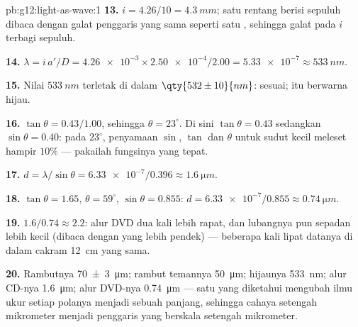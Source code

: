 \begin{solution}{pb:g12:light-as-wave:1}
\textbf{13.} $i = 4.26/10 = \qty{4.3}{mm}$; satu rentang berisi sepuluh
dibaca dengan galat penggaris yang sama seperti satu ,
sehingga galat pada $i$ terbagi sepuluh.

\textbf{14.} $\lambda = i\,a'/D = \num{4.26e-3} \times
\num{2.50e-4}/2.00 = \num{5.33e-7} \approx \qty{533}{nm}$.

\textbf{15.} Nilai $\qty{533}{nm}$ terletak di dalam
$\qty{532 \pm 10}{nm}$: sesuai;  itu berwarna hijau.

\textbf{16.} $\tan\theta = 0.43/1.00$, sehingga $\theta = 23^\circ$. Di
sini $\tan\theta = 0.43$ sedangkan $\sin\theta = 0.40$: pada
$23^\circ$, penyamaan $\sin$, $\tan$ dan $\theta$ untuk sudut kecil
meleset hampir $10\%$ --- pakailah fungsinya yang tepat.

\textbf{17.} $d = \lambda/\sin\theta = \num{6.33e-7}/0.396 \approx
\qty{1.6}{\micro m}$.

\textbf{18.} $\tan\theta = 1.65$, $\theta = 59^\circ$,
$\sin\theta = 0.855$: $d = \num{6.33e-7}/0.855 \approx
\qty{0.74}{\micro m}$.

\textbf{19.} $1.6/0.74 \approx 2.2$: alur DVD dua kali lebih rapat, dan
lubangnya pun sepadan lebih kecil (dibaca dengan  yang  lebih pendek) --- beberapa kali lipat datanya di dalam
cakram \qty{12}{cm} yang sama.

\textbf{20.} Rambutnya \qty{70 \pm 3}{\micro m}; rambut temannya
\qty{50}{\micro m};  hijaunya \qty{533}{nm}; alur CD-nya
\qty{1.6}{\micro m}; alur DVD-nya \qty{0.74}{\micro m} --- satu  yang diketahui mengubah ilmu ukur setiap polanya menjadi
sebuah panjang, sehingga cahaya setengah mikrometer menjadi penggaris
yang berskala setengah mikrometer.
\end{solution}
